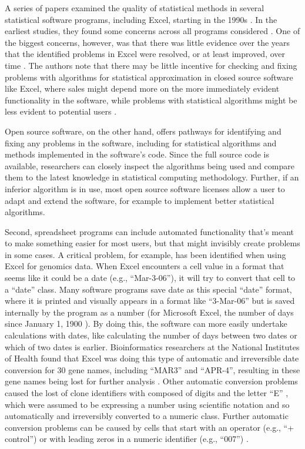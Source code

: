 \documentclass[]{tufte-book}
\begin{document}
A series of papers examined the quality of statistical methods in several
statistical software programs, including Excel, starting in the 1990s
\citep{mccullough1999accuracy, mccullough1999assessing, mccullough2002accuracy, mccullough2005accuracy, mccullough2008accuracy, melard2014accuracy}. In the
earliest studies, they found some concerns across all programs considered
\citep{mccullough1999accuracy, mccullough1999assessing}. One of the biggest
concerns, however, was that there was little evidence over the years that the
identified problems in Excel were resolved, or at least improved, over time
\citep{mccullough2001does, mccullough2008accuracy}. The authors note that there may
be little incentive for checking and fixing problems with algorithms for
statistical approximation in closed source software like Excel, where sales
might depend more on the more immediately evident functionality in the software,
while problems with statistical algorithms might be less evident to potential
users \citep{mccullough2001does}.

Open source software, on the other hand, offers pathways for identifying and fixing
any problems in the software, including for statistical algorithms and methods
implemented in the software's code. Since the full source code is available, researchers
can closely inspect the algorithms being used and compare them to the latest
knowledge in statistical computing methodology. Further, if an inferior algorithm is in
use, most open source software licenses allow a user to adapt and extend the software,
for example to implement better statistical algorithms.

Second, spreadsheet programs can include automated functionality that's meant to
make something easier for most users, but that might invisibly create problems
in some cases. A critical problem, for example, has been identified when using
Excel for genomics data. When Excel encounters a cell value in a format that
seems like it could be a date (e.g., ``Mar-3-06''), it will try to convert that
cell to a ``date'' class. Many software programs save date as this special ``date''
format, where it is printed and visually appears in a format like ``3-Mar-06'' but
is saved internally by the program as a number (for Microsoft Excel, the number
of days since January 1, 1900 \citep{willekens2013chronological}). By doing this, the
software can more easily undertake calculations with dates, like calculating the
number of days between two dates or which of two dates is earlier.
Bioinformatics researchers at the National Institutes of Health found that Excel
was doing this type of automatic and irreversible date conversion for 30 gene
names, including ``MAR3'' and ``APR-4'', resulting in these gene names being lost
for further analysis \citep{zeeberg2004mistaken}. Other automatic conversion problems
caused the lost of clone identifiers with composed of digits and the letter ``E''
\citep{zeeberg2004mistaken, welsh2017escape}, which were assumed to be expressing a
number using scientific notation and so automatically and irreversibly converted
to a numeric class. Further automatic conversion problems can be caused by cells
that start with an operator (e.g., ``+ control'') or with leading zeros in a
numeric identifier (e.g., ``007'') \citep{welsh2017escape}.
\end{document}
